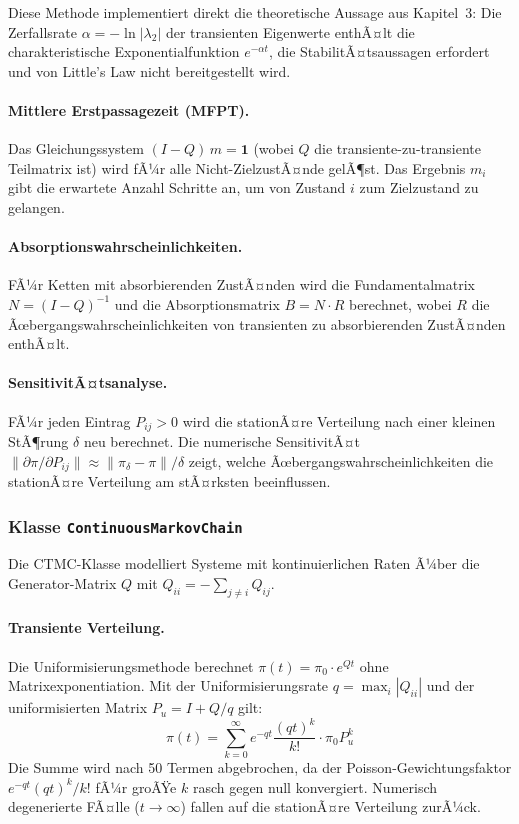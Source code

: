 ﻿\documentclass[a4paper,12pt]{scrreprt}
\theoremstyle{definition}
\begin{document}
Diese Methode implementiert direkt die theoretische Aussage aus Kapitel~3:
Die Zerfallsrate $\alpha = -\ln|\lambda_2|$ der transienten Eigenwerte
enthÃ¤lt die charakteristische Exponentialfunktion $e^{-\alpha t}$, die
StabilitÃ¤tsaussagen erfordert und von Little's Law nicht bereitgestellt wird.

\paragraph{Mittlere Erstpassagezeit (MFPT).}
Das Gleichungssystem $(I - Q)\,m = \mathbf{1}$ (wobei $Q$ die
transiente-zu-transiente Teilmatrix ist) wird fÃ¼r alle Nicht-ZielzustÃ¤nde
gelÃ¶st. Das Ergebnis $m_i$ gibt die erwartete Anzahl Schritte an, um von
Zustand $i$ zum Zielzustand zu gelangen.

\paragraph{Absorptionswahrscheinlichkeiten.}
FÃ¼r Ketten mit absorbierenden ZustÃ¤nden wird die Fundamentalmatrix
$N = (I-Q)^{-1}$ und die Absorptionsmatrix $B = N \cdot R$ berechnet,
wobei $R$ die Ãœbergangswahrscheinlichkeiten von transienten zu
absorbierenden ZustÃ¤nden enthÃ¤lt.

\paragraph{SensitivitÃ¤tsanalyse.}
FÃ¼r jeden Eintrag $P_{ij} > 0$ wird die stationÃ¤re Verteilung nach einer
kleinen StÃ¶rung $\delta$ neu berechnet. Die numerische SensitivitÃ¤t
$\|\partial\pi / \partial P_{ij}\| \approx \|\pi_{\delta} - \pi\| / \delta$
zeigt, welche Ãœbergangswahrscheinlichkeiten die stationÃ¤re Verteilung
am stÃ¤rksten beeinflussen.

\subsubsection{Klasse \texttt{ContinuousMarkovChain}}

Die CTMC-Klasse modelliert Systeme mit kontinuierlichen Raten Ã¼ber die
Generator-Matrix $Q$ mit $Q_{ii} = -\sum_{j \neq i} Q_{ij}$.

\paragraph{Transiente Verteilung.}
Die Uniformisierungsmethode berechnet $\pi(t) = \pi_0 \cdot e^{Qt}$
ohne Matrixexponentiation. Mit der Uniformisierungsrate $q = \max_i |Q_{ii}|$
und der uniformisierten Matrix $P_u = I + Q/q$ gilt:
\begin{equation}
	\pi(t) = \sum_{k=0}^{\infty} e^{-qt} \frac{(qt)^k}{k!} \cdot \pi_0 P_u^k
\end{equation}
Die Summe wird nach 50 Termen abgebrochen, da der Poisson-Gewichtungsfaktor
$e^{-qt}(qt)^k/k!$ fÃ¼r groÃŸe $k$ rasch gegen null konvergiert. Numerisch
degenerierte FÃ¤lle ($t \to \infty$) fallen auf die stationÃ¤re Verteilung zurÃ¼ck.
\end{document}
